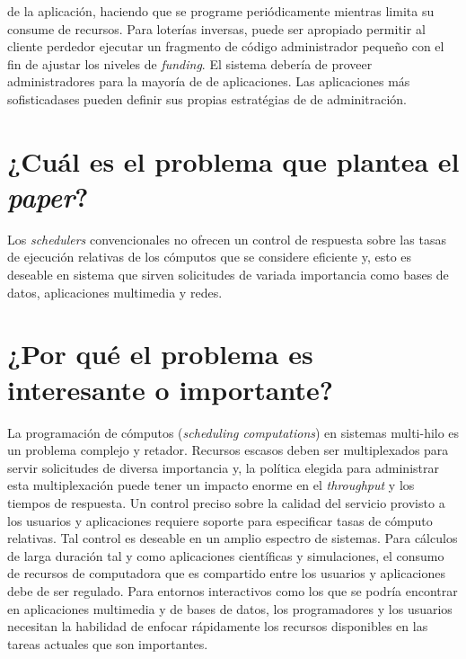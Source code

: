de la aplicación, haciendo que se programe periódicamente mientras limita su consume de recursos. Para loterías inversas, puede ser apropiado permitir al cliente perdedor ejecutar un fragmento de código administrador pequeño con el fin de ajustar los niveles de \textit{funding}. El sistema debería de proveer administradores para la mayoría de de aplicaciones. Las aplicaciones más sofisticadases pueden definir sus propias estratégias de de adminitración.


\section{¿Cuál es el problema que plantea el \textit{paper}?}
Los \textit{schedulers} convencionales no ofrecen un control de respuesta sobre las tasas de ejecución relativas de los cómputos que se considere eficiente y, esto es deseable en sistema que sirven solicitudes de variada importancia como bases de datos, aplicaciones multimedia y redes.

\section{¿Por qué el problema es interesante o importante?} 
La programación de cómputos (\textit{scheduling computations}) en sistemas multi-hilo es un problema complejo y retador. Recursos escasos deben ser multiplexados para servir solicitudes de diversa importancia y, la política elegida para administrar esta multiplexación puede tener un impacto enorme en el \textit{throughput} y los tiempos de respuesta. Un control preciso sobre la calidad del servicio provisto a los usuarios y aplicaciones requiere soporte para especificar tasas de cómputo relativas. Tal control es deseable en un amplio espectro de sistemas. Para cálculos de larga duración tal y como aplicaciones científicas y simulaciones, el consumo de recursos de computadora que es compartido entre los usuarios y aplicaciones debe de ser regulado. Para entornos interactivos como los que se podría encontrar en aplicaciones multimedia y de bases de datos, los programadores y los usuarios necesitan la habilidad de enfocar rápidamente los recursos disponibles en las tareas actuales que son importantes.

